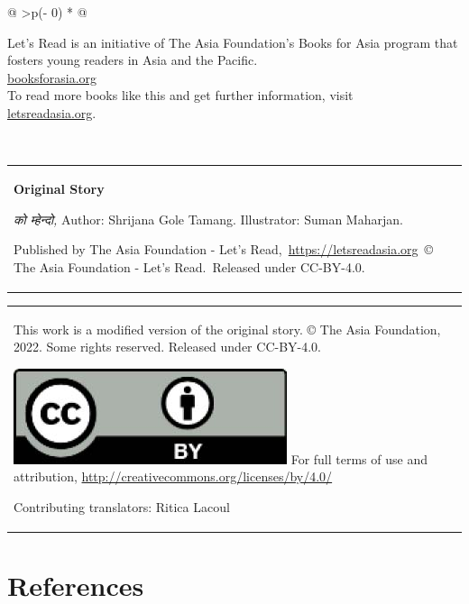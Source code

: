 \documentclass[
  letterpaper,
  DIV=11,
  numbers=noendperiod,
  paper=6in:9in,
  pagesize=pdftex,
  headinclude=on,
  footinclude=on,
  12pt]{scrreprt}
\newlength{\cslhangindent}
\newlength{\cslentryspacingunit} %
\newenvironment{CSLReferences}[2] %
 {%
  \setlength{\parindent}{0pt}
  \ifodd #1
  \let\oldpar\par
  \def\par{\hangindent=\cslhangindent\oldpar}
  \fi
  \setlength{\parskip}{#2\cslentryspacingunit}
 }%
 {}
\begin{document}
\begin{longtable}[]{@{}
  >{\centering\arraybackslash}p{(\columnwidth - 0\tabcolsep) * }@{}}
\toprule\noalign{}
\endhead
\bottomrule\noalign{}
\endlastfoot
\begin{minipage}[t]{\linewidth}\centering
Let's Read is an initiative of The Asia Foundation's Books for Asia
program that fosters young readers in Asia and the Pacific.\\
\href{http://letsreadasia.org/}{booksforasia.org}\\
To read more books like this and get further information, visit\\
\href{http://letsreadasia.org/}{letsreadasia.org}.\strut
\end{minipage} \\
\end{longtable}

\begin{longtable}[]{@{}
  >{\raggedright\arraybackslash}p{}@{}}
\toprule\noalign{}
\endhead
\bottomrule\noalign{}
\endlastfoot
\textbf{Original Story}

\emph{को म्हेन्दो,} Author: Shrijana Gole Tamang. Illustrator: Suman
Maharjan.

Published by The Asia Foundation - Let's
Read,~\href{https://letsreadasia.org/}{https://letsreadasia.org}~© The
Asia Foundation - Let's Read.~Released under CC-BY-4.0. \\
\end{longtable}

\begin{longtable}[]{@{}
  >{\raggedright\arraybackslash}p{}@{}}
\toprule\noalign{}
\endhead
\bottomrule\noalign{}
\endlastfoot
This work is a modified version of the original story. © The Asia
Foundation, 2022. Some rights reserved. Released under CC-BY-4.0.

\includegraphics{images/ccby.jpg} For full terms of use and attribution,
\url{http://creativecommons.org/licenses/by/4.0/}

Contributing translators: Ritica Lacoul \\
\end{longtable}


\hypertarget{references}{%
\chapter*{References}\label{references}}


\hypertarget{refs}{}
\begin{CSLReferences}{0}{0}
\end{CSLReferences}
\end{document}
